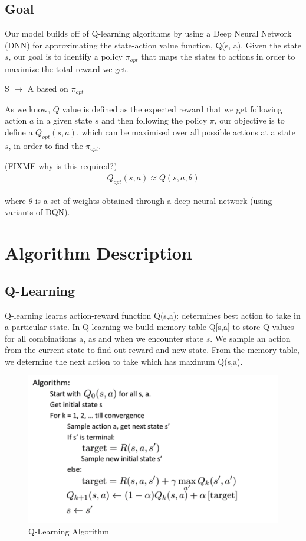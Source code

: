 \subsection{Goal}

Our model builds off of Q-learning algorithms by using a Deep Neural Network (DNN) for approximating the state-action value function, Q(s, a). 
Given the state $s$, our goal is to identify a policy $\pi_{opt}$ that maps the states to actions in order to maximize the total reward we get.

\begin{center}
S $\rightarrow$ A based on $\pi_{opt}$
\end{center}

As we know, $Q$ value is defined as the expected reward that we get following action $a$ in a given state $s$ and then following the policy $\pi$, our objective is to define a $Q_{opt} (s, a)$, which can be maximised over all possible actions at a state $s$, in order to find the $\pi_{opt}$.

(FIXME why is this required?)
\begin{align*}
Q_{opt} (s,a) \approx Q(s, a, \theta)
\end{align*}

where $\theta$ is a set of weights obtained through a deep neural network (using variants of DQN).

\section{Algorithm Description}

\subsection{Q-Learning}
Q-learning learns action-reward function Q(s,a): determines best action to take in a particular state. In Q-learning we build memory table Q[s,a] to store Q-values for all combinations a, as and when we encounter state $s$. We sample an action from the current state to find out reward  and new state. From the memory table, we determine the next action to take which has maximum Q(s,a).

\begin{figure}%
\centering
\includegraphics[width=0.6\columnwidth]{figures/Q-learning.png}%
\caption{Q-Learning Algorithm}%
\label{fig:datastats}%
\end{figure}


